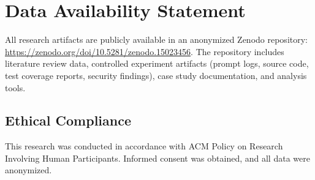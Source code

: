 \documentclass[sigconf]{acmart}
\begin{document}
\section*{Data Availability Statement}

All research artifacts are publicly available in an anonymized Zenodo repository: \url{https://zenodo.org/doi/10.5281/zenodo.15023456}. The repository includes literature review data, controlled experiment artifacts (prompt logs, source code, test coverage reports, security findings), case study documentation, and analysis tools.

\subsection*{Ethical Compliance}

This research was conducted in accordance with ACM Policy on Research Involving Human Participants. Informed consent was obtained, and all data were anonymized.



\end{document}
